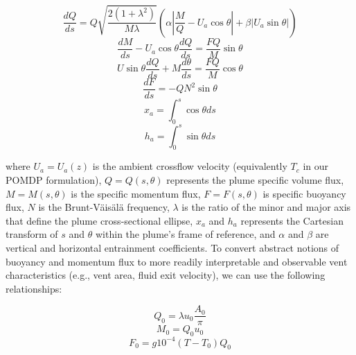 \begin{equation}
    \frac{dQ}{ds} = Q\sqrt{\frac{2(1+\lambda^2)}{M\lambda}}(\alpha|\frac{M}{Q} - U_a\cos\theta| + \beta|U_a\sin\theta|)
\end{equation}
\begin{equation}
    \frac{dM}{ds} - U_a\cos\theta\frac{dQ}{ds} = \frac{FQ}{M}\sin\theta 
\end{equation}
\begin{equation}
    U\sin\theta\frac{dQ}{ds} + M\frac{d\theta}{ds} = \frac{FQ}{M}\cos\theta
\end{equation}
\begin{equation}
    \frac{dF}{ds} = -QN^2\sin\theta
\end{equation}
\begin{equation}
    x_a = \int_0^s\cos\theta ds
\end{equation}
\begin{equation}
    h_a = \int_0^s \sin\theta ds
\end{equation}

where $U_a = U_a(z)$ is the ambient crossflow velocity (equivalently $T_c$ in our POMDP formulation), $Q = Q(s,\theta)$ represents the plume specific volume flux, $M = M(s, \theta)$ is the specific momentum flux, $F = F(s, \theta)$ is specific buoyancy flux, $N$ is the Brunt-V\"ais\"al\"a frequency, $\lambda$ is the ratio of the minor and major axis that define the plume cross-sectional ellipse, $x_a$ and $h_a$ represents the Cartesian transform of $s$ and $\theta$ within the plume's frame of reference, and $\alpha$ and $\beta$ are vertical and horizontal entrainment coefficients. To convert abstract notions of buoyancy and momentum flux to more readily interpretable and observable vent characteristics (e.g., vent area, fluid exit velocity), we can use the following relationships:

\begin{equation}
    Q_0 = \lambda u_0 \frac{A_0}{\pi}
\label{eq:heat_flux}
\end{equation}
\begin{equation}
    M_0 = Q_0 u_0
\label{eq:momentum_flux}
\end{equation}
\begin{equation}
    F_0 = g10^{-4}(T-T_0)Q_0
\label{eq:buoyancy_flux}
\end{equation}


